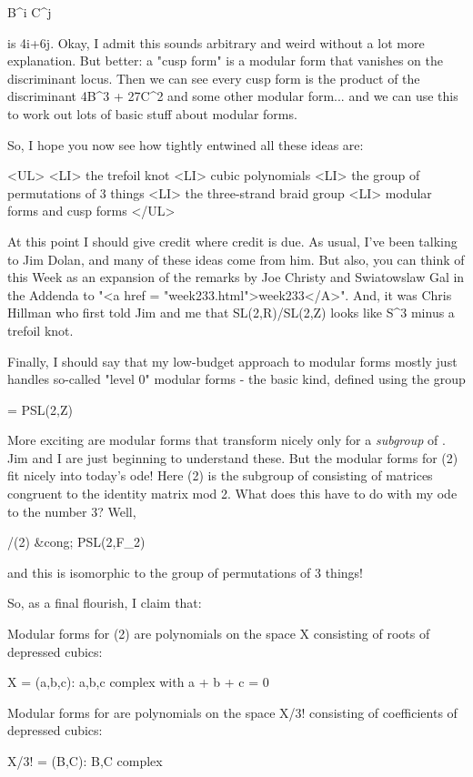 B^{i} C^{j}

is 4i+6j.  Okay, I admit this sounds arbitrary and weird without a lot
more explanation.  But better: a "cusp form" is a modular
form that vanishes on the discriminant locus.  Then we can see every
cusp form is the product of the discriminant 4B^{3} +
27C^{2} and some other modular form... and we can use this to
work out lots of basic stuff about modular forms.

So, I hope you now see how tightly entwined all these ideas are:

<UL>
<LI>
  the trefoil knot
<LI>
  cubic polynomials
<LI>
  the group of permutations of 3 things
<LI>
  the three-strand braid group
<LI>
  modular forms and cusp forms
</UL>

At this point I should give credit where credit is due.  As usual,
I've been talking to Jim Dolan, and many of these ideas come from
him.  But also, you can think of this Week as an expansion of the
remarks by Joe Christy and Swiatowslaw Gal in the Addenda to 
"<a href = "week233.html">week233</A>".  And, it was
Chris Hillman who first told Jim and me that SL(2,R)/SL(2,Z) looks
like S^{3} minus a trefoil knot.

Finally, I should say that my low-budget approach to modular forms
mostly just handles so-called "level 0" modular forms - the basic 
kind, defined using the group 

\Gamma  = PSL(2,Z)

More exciting are modular forms that transform nicely only for a 
\emph{subgroup} of \Gamma .   Jim and I are just beginning to understand
these.  But the modular forms for \Gamma (2) fit nicely into today's 
ode!  Here \Gamma (2) is the subgroup of \Gamma  consisting of matrices
congruent to the identity matrix mod 2.  What does this have to do
with my ode to the number 3?  Well,

\Gamma /\Gamma (2) &cong; PSL(2,F_{2}) 

and this is isomorphic to the group of permutations of 3 things! 

So, as a final flourish, I claim that:

Modular forms for \Gamma (2) are polynomials on the space X
consisting of roots of depressed cubics:

X = {(a,b,c): a,b,c complex with a + b + c = 0}

Modular forms for \Gamma  are polynomials on the space X/3!
consisting of coefficients of depressed cubics:

X/3! = {(B,C): B,C complex}


